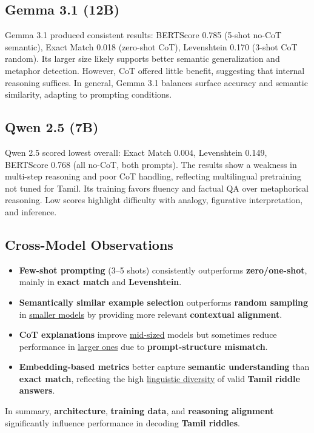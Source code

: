 \documentclass[11pt]{article}
\begin{document}
\subsection{Gemma 3.1 (12B)}
Gemma 3.1 produced consistent results: BERTScore 0.785 (5-shot no-CoT semantic), Exact Match 0.018 (zero-shot CoT), Levenshtein 0.170 (3-shot CoT random). Its larger size likely supports better semantic generalization and metaphor detection. However, CoT offered little benefit, suggesting that internal reasoning suffices. In general, Gemma 3.1 balances surface accuracy and semantic similarity, adapting to prompting conditions.

\subsection{Qwen 2.5 (7B)}
Qwen 2.5 scored lowest overall: Exact Match 0.004, Levenshtein 0.149, BERTScore 0.768 (all no-CoT, both prompts). The results show a weakness in multi-step reasoning and poor CoT handling, reflecting multilingual pretraining not tuned for Tamil. Its training favors fluency and factual QA over metaphorical reasoning. Low scores highlight difficulty with analogy, figurative interpretation, and inference.

\subsection{Cross-Model Observations}
\begin{itemize}
\item \textbf{Few-shot prompting} (3–5 shots) consistently outperforms \textbf{zero/one-shot}, mainly in \textbf{exact match} and \textbf{Levenshtein}.  
\item \textbf{Semantically similar example selection} outperforms \textbf{random sampling} in \underline{smaller models} by providing more relevant \textbf{contextual alignment}.  
\item \textbf{CoT explanations} improve \underline{mid-sized} models but sometimes reduce performance in \underline{larger ones} due to \textbf{prompt-structure mismatch}.  
\item \textbf{Embedding-based metrics} better capture \textbf{semantic understanding} than \textbf{exact match}, reflecting the high \underline{linguistic diversity} of valid \textbf{Tamil riddle answers}.  
\end{itemize}
In summary, \textbf{architecture}, \textbf{training data}, and \textbf{reasoning alignment} significantly influence performance in decoding \textbf{Tamil riddles}.
\end{document}
